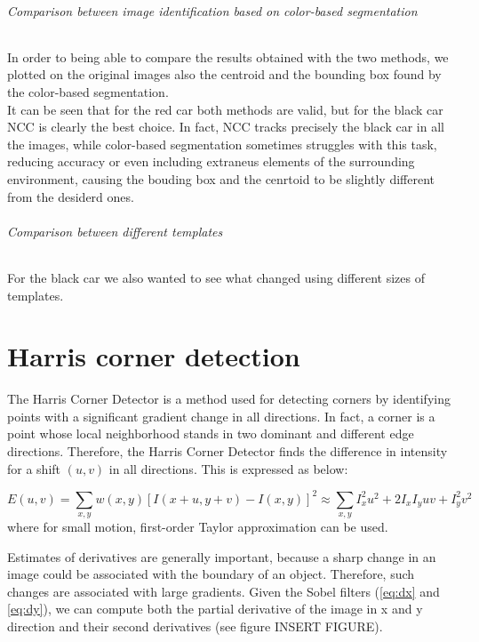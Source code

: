 \subparagraph{Comparison between image identification based on color-based segmentation}
In order to being able to compare the results obtained with the two methods, we plotted on the original images also the centroid and the bounding box found by the 
color-based segmentation.\\ It can be seen that for the red car both methods are valid, but for the black car NCC is clearly the best choice. In fact, NCC tracks precisely the
black car in all the images, while color-based segmentation sometimes struggles with this task, reducing accuracy or even including extraneus elements of the surrounding 
environment, causing the bouding box and the cenrtoid to be slightly different from the desiderd ones.

\subparagraph{Comparison between different templates}
For the black car we also wanted to see what changed using different sizes of templates.





\chapter{Harris corner detection}


The Harris Corner Detector is a method used for detecting corners by identifying points with a significant gradient change in all directions. 
In fact, a corner is a point whose local neighborhood stands in two dominant and different edge directions. Therefore, the Harris Corner Detector finds the difference in intensity for a shift $(u, v)$ in all directions. This is expressed as below:

\begin{equation}
	E(u, v) = \sum_{x, y} w(x, y) [I(x+u, y+v)-I(x, y)]^2 \approx \sum_{x, y} I_x^2 u^2 + 2I_x I_y uv + I_y^2 v^2
\end{equation}
where for small motion, first-order Taylor approximation can be used.


Estimates of derivatives are generally important, because a sharp change in an image could be associated with the boundary of an object. Therefore, such changes are associated with large gradients. Given the Sobel filters (\ref{eq:dx} and \ref{eq:dy}), we can compute both the partial derivative of the image in x and y direction and their second derivatives (see figure INSERT FIGURE).

